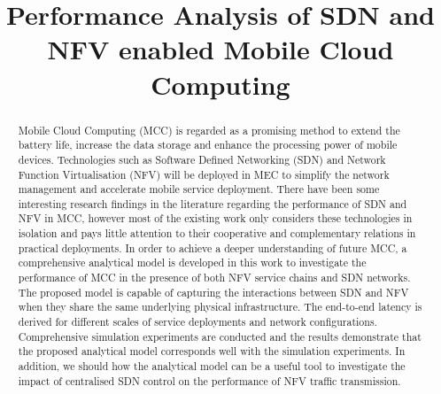 \documentclass[conference]{IEEEtran}
\begin{document}
\title{Performance Analysis of SDN and NFV enabled Mobile Cloud Computing}

\author{
}
 
\maketitle

\begin{abstract}
Mobile Cloud Computing (MCC) is regarded as a promising method to extend the battery life, increase the data storage and enhance the processing power of mobile devices. Technologies such as Software Defined Networking (SDN) and Network Function Virtualisation (NFV) will be deployed in MEC to simplify the network management and accelerate mobile service deployment. There have been some interesting research findings in the literature regarding the performance of SDN and NFV in MCC, however most of the existing work only considers these technologies in isolation and pays little attention to their cooperative and complementary relations in practical deployments.  In order to achieve a deeper understanding of future MCC, a comprehensive analytical model is developed in this work to investigate the performance of MCC in the presence of both NFV service chains and SDN networks. The proposed model is capable of capturing the interactions between SDN and NFV when they share the same underlying physical infrastructure. The end-to-end latency is derived for different scales of service deployments and network configurations. Comprehensive simulation experiments are conducted and the results demonstrate that the proposed analytical model corresponds well with the simulation experiments. In addition, we should how the analytical model can be a useful tool to investigate the impact of centralised SDN control on the performance of NFV traffic transmission. 
\end{abstract}













\end{document}
